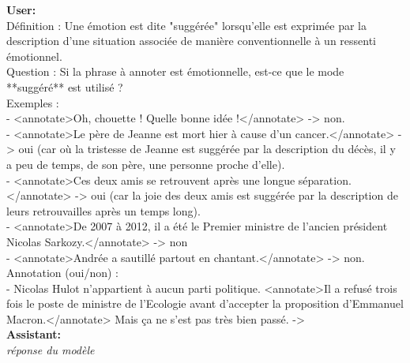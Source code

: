 {\textbf{User:}\\
Définition : Une émotion est dite "suggérée" lorsqu'elle est exprimée par la description d'une situation associée de manière conventionnelle à un ressenti émotionnel.\\

Question : Si la phrase à annoter est émotionnelle, est-ce que le mode **suggéré** est utilisé ?\\

Exemples :\\
- <annotate>Oh, chouette ! Quelle bonne idée !</annotate> -> non.\\
- <annotate>Le père de Jeanne est mort hier à cause d'un cancer.</annotate> -> oui (car où la tristesse de Jeanne est suggérée par la description du décès, il y a peu de temps, de son père, une personne proche d'elle).\\
- <annotate>Ces deux amis se retrouvent après une longue séparation.</annotate> -> oui (car la joie des deux amis est suggérée par la description de leurs retrouvailles après un temps long).\\
- <annotate>De 2007 à 2012, il a été le Premier ministre de l'ancien président Nicolas Sarkozy.</annotate> -> non\\
- <annotate>Andrée a sautillé partout en chantant.</annotate> -> non.\\

Annotation (oui/non) :\\
- Nicolas Hulot n’appartient à aucun parti politique. <annotate>Il a refusé trois fois le poste de ministre de l’Ecologie avant d’accepter la proposition d’Emmanuel Macron.</annotate> Mais ça ne s’est pas très bien passé.  -> \\

\textbf{Assistant:}\\
\textit{réponse du modèle}
}


